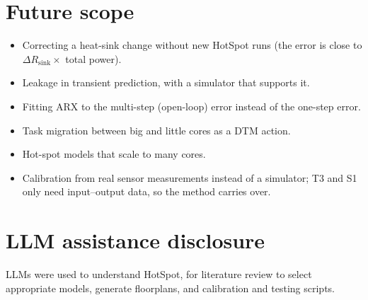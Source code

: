 \documentclass[11pt,a4paper]{article}
\begin{document}
\section{Future scope}
\begin{itemize}
  \item Correcting a heat-sink change without new HotSpot runs (the error is close to
        $\Delta R_\text{sink}\times$ total power).
  \item Leakage in transient prediction, with a simulator that supports it.
  \item Fitting ARX to the multi-step (open-loop) error instead of the one-step error.
  \item Task migration between big and little cores as a DTM action.
  \item Hot-spot models that scale to many cores.
  \item Calibration from real sensor measurements instead of a simulator; T3 and S1 only need
        input--output data, so the method carries over.
\end{itemize}

\section{LLM assistance disclosure}
LLMs were used to understand HotSpot, for literature review to select appropriate models, generate
floorplans, and calibration and testing scripts.
\end{document}
